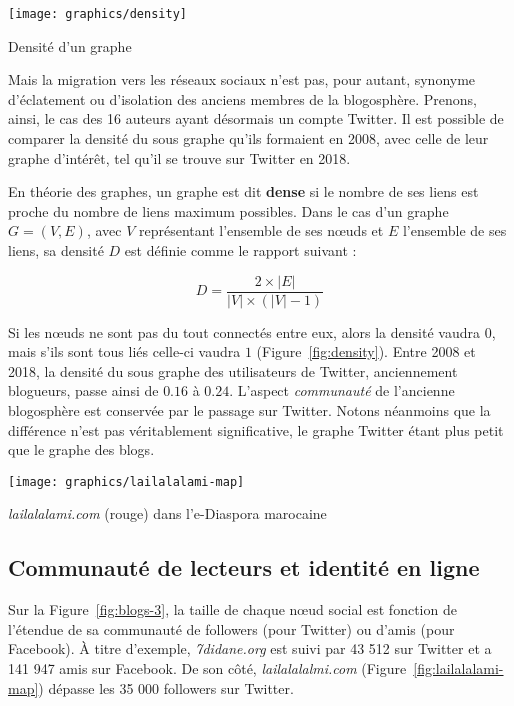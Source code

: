 \documentclass[symmetric,justified,marginals=raggedouter]{tufte-book}
\begin{document}
\begin{marginfigure}%
  \texttt{[image: graphics/density]}
  \vspace*{0.2cm}  
  \caption{Densité d'un graphe}
  \label{fig:density}
\end{marginfigure}

Mais la migration vers les réseaux sociaux n'est pas, pour autant, synonyme d'éclatement ou d'isolation des anciens membres de la blogosphère. Prenons, ainsi, le cas des 16 auteurs ayant désormais un compte Twitter. Il est possible de comparer la densité du sous graphe qu'ils formaient en 2008, avec celle de leur graphe d'intérêt, tel qu'il se trouve sur Twitter en 2018. 

En théorie des graphes, un graphe est dit \textbf{dense} si le nombre de ses liens est proche du nombre de liens maximum possibles. Dans le cas d'un graphe $G=(V,E)$, avec $V$ représentant l'ensemble de ses nœuds et $E$ l'ensemble de ses liens, sa densité $D$ est définie comme le rapport suivant :

\[
	D = \frac{2 \times |E|}{|V| \times (|V| - 1)}
\]

\noindent Si les nœuds ne sont pas du tout connectés entre eux, alors la densité vaudra $0$, mais s'ils sont tous liés celle-ci vaudra $1$ (Figure~\ref{fig:density}). Entre 2008 et 2018, la densité du sous graphe des utilisateurs de Twitter, anciennement blogueurs, passe ainsi de $0.16$ à $0.24$. L'aspect \textit{communauté} de l'ancienne blogosphère est conservée par le passage sur Twitter. Notons néanmoins que la différence n'est pas véritablement significative, le graphe Twitter étant plus petit que le graphe des blogs. 

\begin{marginfigure}%
  \texttt{[image: graphics/lailalalami-map]}
  \vspace*{0.2cm}  
  \caption{\textit{lailalalami.com} (rouge) dans l'e-Diaspora marocaine}
  \label{fig:lailalalami-map}
\end{marginfigure} 

\subsection{Communauté de lecteurs et identité en ligne}

\noindent Sur la Figure~\ref{fig:blogs-3}, la taille de chaque nœud social est fonction de l'étendue de sa communauté de followers (pour Twitter) ou d'amis (pour Facebook). À titre d'exemple, \textit{7didane.org} est suivi par 43 512 sur Twitter et a 141 947 amis sur Facebook. De son côté, \textit{lailalalalmi.com} (Figure~\ref{fig:lailalalami-map}) dépasse les 35 000 followers sur Twitter.
\end{document}
